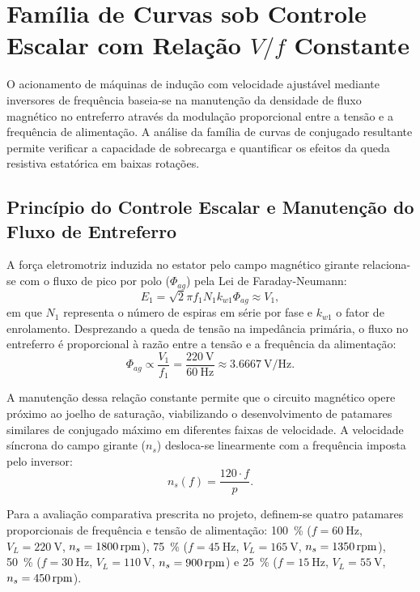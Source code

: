 \section{Família de Curvas sob Controle Escalar com Relação $V/f$ Constante}\label{sec:controle_escalar}

O acionamento de máquinas de indução com velocidade ajustável mediante inversores de frequência baseia-se na manutenção da densidade de fluxo magnético no entreferro através da modulação proporcional entre a tensão e a frequência de alimentação. A análise da família de curvas de conjugado resultante permite verificar a capacidade de sobrecarga e quantificar os efeitos da queda resistiva estatórica em baixas rotações.

\subsection{Princípio do Controle Escalar e Manutenção do Fluxo de Entreferro}\label{subsec:principio_vf}

A força eletromotriz induzida no estator pelo campo magnético girante relaciona-se com o fluxo de pico por polo ($\Phi_{ag}$) pela Lei de Faraday-Neumann:
\begin{equation}
E_1 = \sqrt{2} \pi f_1 N_1 k_{w1} \Phi_{ag} \approx V_1,
\label{eq:fem_faraday_fluxo}
\end{equation}
em que $N_1$ representa o número de espiras em série por fase e $k_{w1}$ o fator de enrolamento. Desprezando a queda de tensão na impedância primária, o fluxo no entreferro é proporcional à razão entre a tensão e a frequência da alimentação:
\begin{equation}
\Phi_{ag} \propto \frac{V_1}{f_1} = \frac{\SI{220}{\volt}}{\SI{60}{\hertz}} \approx \SI{3,6667}{\volt/\hertz}.
\label{eq:razao_vf}
\end{equation}

A manutenção dessa relação constante permite que o circuito magnético opere próximo ao joelho de saturação, viabilizando o desenvolvimento de patamares similares de conjugado máximo em diferentes faixas de velocidade. A velocidade síncrona do campo girante ($n_s$) desloca-se linearmente com a frequência imposta pelo inversor:
\begin{equation}
n_s(f) = \frac{120 \cdot f}{p}.
\label{eq:ns_frequencia}
\end{equation}

Para a avaliação comparativa prescrita no projeto, definem-se quatro patamares proporcionais de frequência e tensão de alimentação: \SI{100}{\percent} ($f = \SI{60}{\hertz}$, $V_L = \SI{220}{\volt}$, $n_s = \SI{1800}{\mathrm{rpm}}$), \SI{75}{\percent} ($f = \SI{45}{\hertz}$, $V_L = \SI{165}{\volt}$, $n_s = \SI{1350}{\mathrm{rpm}}$), \SI{50}{\percent} ($f = \SI{30}{\hertz}$, $V_L = \SI{110}{\volt}$, $n_s = \SI{900}{\mathrm{rpm}}$) e \SI{25}{\percent} ($f = \SI{15}{\hertz}$, $V_L = \SI{55}{\volt}$, $n_s = \SI{450}{\mathrm{rpm}}$).

